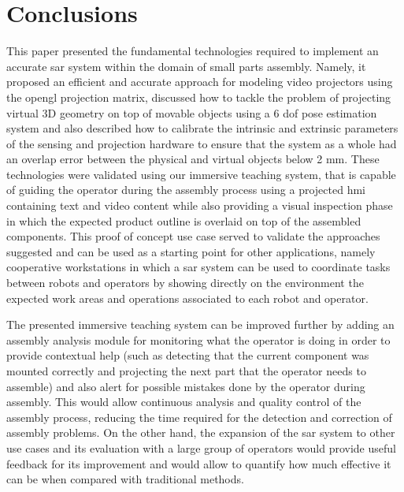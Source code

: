 \section{Conclusions}\label{sec:conclusions}

This paper presented the fundamental technologies required to implement an accurate \gls{sar} system within the domain of small parts assembly. Namely, it proposed an efficient and accurate approach for modeling video projectors using the \gls{opengl} projection matrix, discussed how to tackle the problem of projecting virtual 3D geometry on top of movable objects using a 6 \gls{dof} pose estimation system and also described how to calibrate the intrinsic and extrinsic parameters of the sensing and projection hardware to ensure that the system as a whole had an overlap error between the physical and virtual objects below 2 mm. These technologies were validated using our immersive teaching system, that is capable of guiding the operator during the assembly process using a projected \gls{hmi} containing text and video content while also providing a visual inspection phase in which the expected product outline is overlaid on top of the assembled components. This proof of concept use case served to validate the approaches suggested and can be used as a starting point for other applications, namely cooperative workstations in which a \gls{sar} system can be used to coordinate tasks between robots and operators by showing directly on the environment the expected work areas and operations associated to each robot and operator.

The presented immersive teaching system can be improved further by adding an assembly analysis module for monitoring what the operator is doing in order to provide contextual help (such as detecting that the current component was mounted correctly and projecting the next part that the operator needs to assemble) and also alert for possible mistakes done by the operator during assembly. This would allow continuous analysis and quality control of the assembly process, reducing the time required for the detection and correction of assembly problems. On the other hand, the expansion of the \gls{sar} system to other use cases and its evaluation with a large group of operators would provide useful feedback for its improvement and would allow to quantify how much effective it can be when compared with traditional methods.
